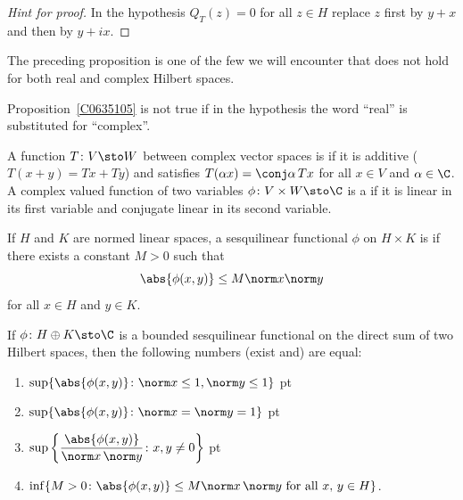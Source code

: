\begin{proof}[\emph{Hint for proof}] In the hypothesis $Q_T(z) = 0$ for all $z \in H$ replace $z$ first by $y + x$
and then by $y + ix$.  \ns
\end{proof}

The preceding proposition is one of the few we will encounter that does not hold for both real and complex Hilbert spaces.

\begin{exam} Proposition~\ref{C0635105} is not true if in the hypothesis the word ``real'' is substituted for ``complex''.
\end{exam}

\begin{defn} A function $T\colon V \sto W$ between complex vector spaces is
 if it is additive ($T(x+y) = Tx + Ty$) and satisfies $T(\alpha x) =
\conj\alpha\, Tx$ for all $x \in V$ and $\alpha \in \C$. A complex valued function of two
variables $\phi\colon V \times W \sto \C$ is a
 if it is linear in its first variable and conjugate linear
in its second variable.

If $H$ and $K$ are normed linear spaces, a sesquilinear functional $\phi$ on $H \times K$
is
 if there exists a constant $M > 0$ such that
    \[ \abs{\phi(x,y)} \le M\norm x\norm y \]
for all $x \in H$ and $y \in K$.
\end{defn}

\begin{prop} If $\phi \colon H \oplus K \sto \C$ is a bounded sesquilinear functional on
the direct sum of two Hilbert spaces, then the following numbers (exist and) are equal:
 \begin{enumerate}[label=\rm{(\alph*)}]
    \item $\sup\{\abs{\phi(x,y)}\colon \norm x \le 1, \norm y \le 1\}$
  pt
    \item $\sup\{\abs{\phi(x,y)}\colon \norm x = \norm y = 1\}$
  pt
    \item $\sup\left\{\dfrac{\abs{\phi(x,y)}}{\norm x\,\norm y}\colon x,y \ne 0\right\}$
  pt
    \item $\inf\{M > 0\colon \abs{\phi(x,y)} \le M\norm x\,\norm y
                    \text{ for all $x$, $y \in H$}\}$.
 \end{enumerate}
\end{prop}

